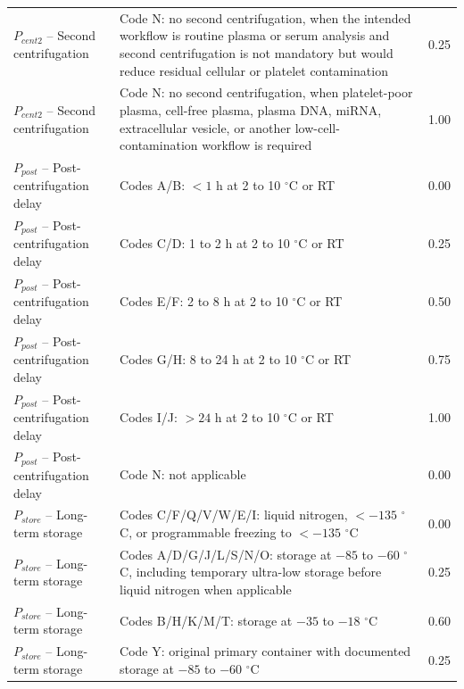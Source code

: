 \documentclass[preprint,12pt]{elsarticle}
\begin{document}
\begin{longtable}{@{}p{3.0cm}p{8.2cm}p{1.2cm}@{}}
\(P_{cent2}\) -- Second centrifugation
& Code N: no second centrifugation, when the intended workflow is routine plasma or serum analysis and second centrifugation is not mandatory but would reduce residual cellular or platelet contamination
& 0.25 \\

\(P_{cent2}\) -- Second centrifugation
& Code N: no second centrifugation, when platelet-poor plasma, cell-free plasma, plasma DNA, miRNA, extracellular vesicle, or another low-cell-contamination workflow is required
& 1.00 \\

\midrule

\(P_{post}\) -- Post-centrifugation delay
& Codes A/B: \(<1\) h at 2 to 10 \(^{\circ}\)C or RT
& 0.00 \\

\(P_{post}\) -- Post-centrifugation delay
& Codes C/D: 1 to 2 h at 2 to 10 \(^{\circ}\)C or RT
& 0.25 \\

\(P_{post}\) -- Post-centrifugation delay
& Codes E/F: 2 to 8 h at 2 to 10 \(^{\circ}\)C or RT
& 0.50 \\

\(P_{post}\) -- Post-centrifugation delay
& Codes G/H: 8 to 24 h at 2 to 10 \(^{\circ}\)C or RT
& 0.75 \\

\(P_{post}\) -- Post-centrifugation delay
& Codes I/J: \(>24\) h at 2 to 10 \(^{\circ}\)C or RT
& 1.00 \\

\(P_{post}\) -- Post-centrifugation delay
& Code N: not applicable
& 0.00 \\

\midrule

\(P_{store}\) -- Long-term storage
& Codes C/F/Q/V/W/E/I: liquid nitrogen, \(<-135\) \(^{\circ}\)C, or programmable freezing to \(<-135\) \(^{\circ}\)C
& 0.00 \\

\(P_{store}\) -- Long-term storage
& Codes A/D/G/J/L/S/N/O: storage at \(-85\) to \(-60\) \(^{\circ}\)C, including temporary ultra-low storage before liquid nitrogen when applicable
& 0.25 \\

\(P_{store}\) -- Long-term storage
& Codes B/H/K/M/T: storage at \(-35\) to \(-18\) \(^{\circ}\)C
& 0.60 \\

\(P_{store}\) -- Long-term storage
& Code Y: original primary container with documented storage at \(-85\) to \(-60\) \(^{\circ}\)C
& 0.25 \\


\end{longtable}
\end{document}
